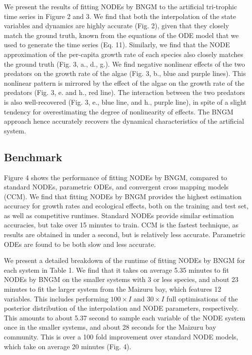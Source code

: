\documentclass[11pt, oneside]{article}
\begin{document}
We present the results of fitting NODEs by BNGM to the artificial tri-trophic time series in Figure 2 and 3.
We find that both the interpolation of the state variables and dynamics are highly accurate (Fig. 2), given that they closely match the ground truth, known from the equations of the ODE model that we used to generate the time series (Eq. 11).
Similarly, we find that the NODE approximation of the per-capita growth rate of each species also closely matches the ground truth (Fig. 3, a., d., g.). 
We find negative nonlinear effects of the two predators on the growth rate of the algae (Fig. 3, b., blue and purple lines).
This nonlinear pattern is mirrored by the effect of the algae on the growth rate of the predators (Fig. 3, e. and h., red line).
The interaction between the two predators is also well-recovered (Fig. 3, e., blue line, and h., purple line), in spite of a slight tendency for overestimating the degree of nonlinearity of effects.
The BNGM approach hence accurately recovers the dynamical characteristics of the artificial system.

\subsection{Benchmark}

Figure 4 shows the performance of fitting NODEs by BNGM, compared to standard NODEs, parametric ODEs, and convergent cross mapping models (CCM).
We find that fitting NODEs by BNGM provides the highest estimation accuracy for growth rates and ecological effects, both on the training and test set, as well as competitive runtimes. 
Standard NODEs provide similar estimation accuracies, but take over 15 minutes to train. 
CCM is the fastest technique, as results are obtained in under a second, but is relatively less accurate.
Parametric ODEs are found to be both slow and less accurate.

We present a detailed breakdown of the runtime of fitting NODEs by BNGM for each system in Table 1.
We find that it takes on average 5.35 minutes to fit NODEs by BNGM on the smaller systems with 3 or less species, and about 23 minutes to fit the larger system from the Maizuru bay, which features 12 variables.
This includes performing $100 \times I$ and $30 \times I$ full optimisations of the posterior distribution of the interpolation and NODE parameters, respectively. 
This amounts to about 5.37 second to sample each variable of the NODE system once in the smaller systems, and about 28 seconds for the Maizuru bay community.
This is over a 100 fold improvement over standard NODE models, which take on average 20 minutes (Fig. 4).
\end{document}
